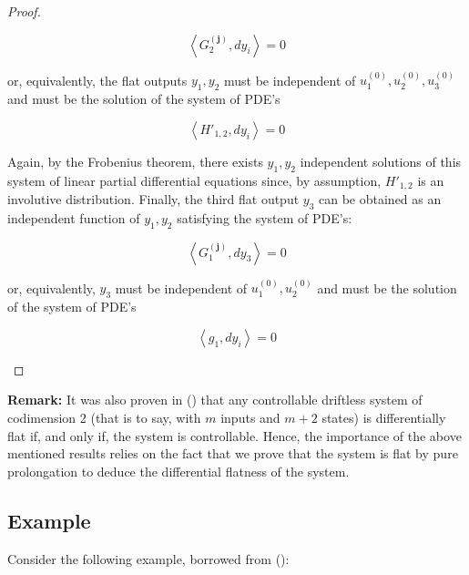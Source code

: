 \documentclass[10pt]{article}
\newcommand{\3}{\mathbf{3}}
\newcommand{\2}{\mathbf{2}}
\newcommand{\1}{\mathbf{1}}
\newcommand{\0}{\mathbf{0}}
\newcommand{\bj}{\mathbf{j}}
\begin{document}
\begin{proof}
\begin{enumerate}
\[ \left< G_{2}^{(\bj)},  dy_{i} \right>= 0 \]

or, equivalently, the flat outputs $y_1,y_2$ must be independent of $u_1^{(0)},u_2^{(0)},u_3^{(0)}$ and must be the solution of the system of PDE's

\[ \left< H'_{1,2},  dy_{i} \right>= 0 \]

Again, by the Frobenius theorem, there exists $y_1,y_2$ independent solutions of this system of linear partial differential equations since, by assumption, $H'_{1,2}$ is an involutive distribution. Finally, the third flat output $y_3$ can be obtained as an independent function of $y_1,y_2$ satisfying the system of PDE's:

\[ \left< G_{1}^{(\bj)},  dy_{3} \right>= 0 \]

or, equivalently, $y_3$ must be independent of $u_1^{(0)},u_2^{(0)}$ and must be the solution of the system of PDE's

\[ \left< g_1,  dy_{i} \right>= 0 \]

\end{enumerate}

\end{proof}

{\bf Remark:} It was also proven in (\cite{MR95}) that any controllable driftless system of codimension 2 (that is to say, with $m$ inputs and $m+2$ states) is differentially flat if, and only if, the system is controllable. Hence, the importance of the above mentioned results relies on the fact that we prove that the system is flat by pure prolongation to deduce the differential flatness of the system.

\subsection{Example}

Consider the following example, borrowed from (\cite{sampei}):
\end{document}
